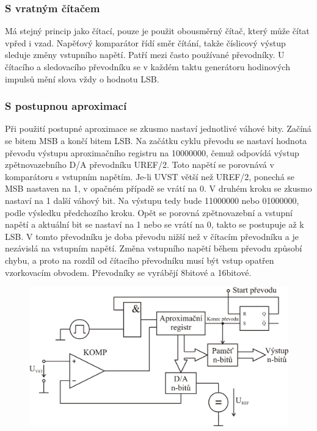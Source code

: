 \subsubsection{S vratným čítačem}
Má stejný princip jako čítací, pouze je použit obousměrný čítač, který může čítat vpřed i vzad. Napěťový komparátor řídí směr čítání, takže číslicový výstup sleduje změny vstupního napětí. Patří mezi často používané převodníky. U čítacího a sledovacího převodníku se v každém taktu generátoru hodinových impulsů mění slova vždy o hodnotu LSB.

\subsubsection{S postupnou aproximací}
Při použití postupné aproximace se zkusmo nastaví jednotlivé váhové bity. Začíná se bitem MSB a končí bitem LSB. Na začátku cyklu převodu se nastaví hodnota převodu výstupu aproximačního registru na 10000000, čemuž odpovídá výstup zpětnovazebního D/A převodníku UREF/2. Toto napětí se porovnává v komparátoru s vstupním napětím. Je-li UVST větší než UREF/2, ponechá se MSB nastaven na 1, v opačném případě se vrátí na 0. V druhém kroku se zkusmo nastaví na 1 další váhový bit. Na výstupu tedy bude 11000000 nebo 01000000, podle výsledku předchozího kroku. Opět se porovná zpětnovazební a vstupní napětí a aktuální bit se nastaví na 1 nebo se vrátí na 0, takto se postupuje až k LSB. V tomto převodníku je doba převodu nižší než v čítacím převodníku a je nezávislá na vstupním napětí. Změna vstupního napětí během převodu způsobí chybu, a proto na rozdíl od čítacího převodníku musí být vstup opatřen vzorkovacím obvodem. Převodníky se vyrábějí 8bitové a 16bitové.
\begin{figure}[htbp]
\centering
\includegraphics[scale=0.5]{sections/5_ad_prevodiky/images/Kompenzacni_sledovaci_AD.png}
\end{figure}
